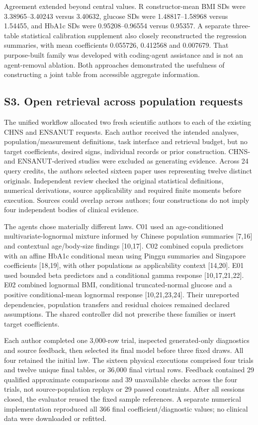 \documentclass[sigconf,review]{acmart}
\begin{document}
Agreement extended beyond central values. R constructor-mean BMI SDs were 3.38965–\allowbreak{}3.40243 versus 3.40632, glucose SDs were 1.48817–\allowbreak{}1.58968 versus 1.54455, and HbA1c SDs were 0.95208–\allowbreak{}0.96554 versus 0.95357. A separate three-table statistical calibration supplement also closely reconstructed the regression summaries, with mean coefficients 0.055726, 0.412568 and 0.007679. That purpose-built family was developed with coding-agent assistance and is not an agent-removal ablation. Both approaches demonstrated the usefulness of constructing a joint table from accessible aggregate information.


\subsection*{S3. Open retrieval across population requests}

The unified workflow allocated two fresh scientific authors to each of the existing CHNS and ENSANUT requests. Each author received the intended analyses, population/\allowbreak{}measurement definitions, task interface and retrieval budget, but no target coefficients, desired signs, individual records or prior construction. CHNS- and ENSANUT-derived studies were excluded as generating evidence. Across 24 query credits, the authors selected sixteen paper uses representing twelve distinct originals. Independent review checked the original statistical definitions, numerical derivations, source applicability and required finite moments before execution. Sources could overlap across authors; four constructions do not imply four independent bodies of clinical evidence.


The agents chose materially different laws. C01 used an age-conditioned multivariate-lognormal mixture informed by Chinese population summaries [7,16] and contextual age/\allowbreak{}body-size findings [10,17]. C02 combined copula predictors with an affine HbA1c conditional mean using Pinggu summaries and Singapore coefficients [18,19], with other populations as applicability context [14,20]. E01 used bounded beta predictors and a conditional gamma response [10,17,21,22]. E02 combined lognormal BMI, conditional truncated-normal glucose and a positive conditional-mean lognormal response [10,21,23,24]. Their unreported dependencies, population transfers and residual choices remained declared assumptions. The shared controller did not prescribe these families or insert target coefficients.


Each author completed one 3,000-row trial, inspected generated-only diagnostics and source feedback, then selected its final model before three fixed draws. All four retained the initial law. The sixteen physical executions comprised four trials and twelve unique final tables, or 36,000 final virtual rows. Feedback contained 29 qualified approximate comparisons and 39 unavailable checks across the four trials, not source-population replays or 29 passed constraints. After all sessions closed, the evaluator reused the fixed sample references. A separate numerical implementation reproduced all 366 final coefficient/\allowbreak{}diagnostic values; no clinical data were downloaded or refitted.
\end{document}
